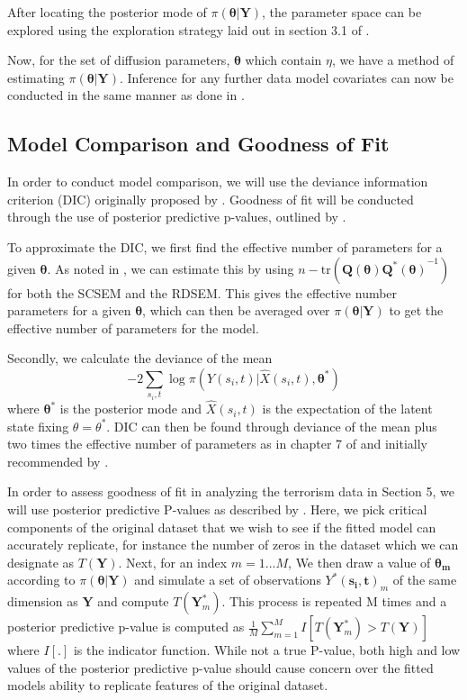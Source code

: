 \documentclass[11pt]{isuthesis}
\begin{document}
After locating the posterior mode of $\pi(\boldsymbol{\theta}|\boldsymbol{Y})$, the parameter space can be explored using the exploration strategy laid out in section 3.1 of \cite{rue2009approximate}.

Now, for the set of diffusion parameters, $\boldsymbol{\theta}$ which contain $\eta$, we have a method of estimating $\pi(\boldsymbol{\theta}|\boldsymbol{Y})$.  Inference for any further data model covariates can now be conducted in the same manner as done in \cite{rue2009approximate}. 
\subsection{Model Comparison and Goodness of Fit}
In order to conduct model comparison, we will use the deviance information criterion (DIC) originally proposed by \cite{spiegelhalter2002bayesian}.  Goodness of fit will be conducted through the use of posterior predictive p-values, outlined by \cite{gelman1996posterior}.

To approximate the DIC, we first find the effective number of parameters for a given $\boldsymbol{\theta}$.  As noted in \cite{rue2009approximate}, we can estimate this by using $n-\text{tr}\left(\boldsymbol{Q(\theta)}\boldsymbol{Q^*(\theta)}^{-1}\right)$ for both the SCSEM and the RDSEM.  This gives the effective number parameters for a given $\boldsymbol{\theta}$, which can then be averaged over $\pi(\boldsymbol{\theta}|\boldsymbol{Y})$ to get the effective number of parameters for the model.

Secondly, we calculate the deviance of the mean
\begin{equation}
-2\sum_{s_i,t} \log \pi\left(Y(s_i,t)|\hat{X}(s_i,t),\boldsymbol{\theta^*}\right)
\end{equation} where $\boldsymbol{\theta^*}$ is the posterior mode and $\hat{X}(s_i,t)$ is the expectation of the latent state fixing $\theta=\theta^*$.  DIC can then be found through deviance of the mean plus two times the effective number of parameters as in chapter 7 of \cite{gelman2014bayesian} and initially recommended by \cite{spiegelhalter2002bayesian}.

In order to assess goodness of fit in analyzing the terrorism data in Section 5, we will use posterior predictive P-values as described by \cite{gelman1996posterior}.  Here, we pick critical components of the original dataset that we wish to see if the fitted model can accurately replicate, for instance the number of zeros in the dataset which we can designate as $T(\boldsymbol{Y})$.  Next, for an index $m=1...M$, We then draw a value of $\boldsymbol{\theta_m}$ according to $\pi(\boldsymbol{\theta}|\boldsymbol{Y})$ and simulate a set of observations $Y^*(\boldsymbol{s_i,t})_m$ of the same dimension as $\boldsymbol{Y}$ and compute $T(\boldsymbol{Y}^*_m)$.  This process is repeated M times and a posterior predictive p-value is computed as $\frac{1}{M}\sum_{m=1}^M I\left[T(\boldsymbol{Y}^*_m) > T(\boldsymbol{Y}) \right]$ where $I\left[ . \right]$ is the indicator function.  While not a true P-value, both high and low values of the posterior predictive p-value should cause concern over the fitted models ability to replicate features of the original dataset.
\end{document}
